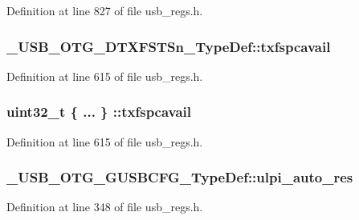 Definition at line 827 of file usb\-\_\-regs.\-h.

\hypertarget{group___u_s_b___o_t_g___d_r_i_v_e_r_ga8c5fd712fbdfea0b80c533af69d25f33}{
\subsubsection[{txfspcavail}]{ \-\_\-\-U\-S\-B\-\_\-\-O\-T\-G\-\_\-\-D\-T\-X\-F\-S\-T\-Sn\-\_\-\-Type\-Def\-::txfspcavail}}\label{group___u_s_b___o_t_g___d_r_i_v_e_r_ga8c5fd712fbdfea0b80c533af69d25f33}


Definition at line 615 of file usb\-\_\-regs.\-h.

\hypertarget{group___u_s_b___o_t_g___d_r_i_v_e_r_ga9bddde86aafdea74dd4a18180c1a6202}{
\subsubsection[{txfspcavail}]{\setlength{\rightskip}{0pt plus 5cm}uint32\-\_\-t \{ ... \} \-::txfspcavail}}\label{group___u_s_b___o_t_g___d_r_i_v_e_r_ga9bddde86aafdea74dd4a18180c1a6202}


Definition at line 615 of file usb\-\_\-regs.\-h.

\hypertarget{group___u_s_b___o_t_g___d_r_i_v_e_r_ga7eac0fd686a7c2a5fb6806f37eb05c15}{
\subsubsection[{ulpi\-\_\-auto\-\_\-res}]{ \-\_\-\-U\-S\-B\-\_\-\-O\-T\-G\-\_\-\-G\-U\-S\-B\-C\-F\-G\-\_\-\-Type\-Def\-::ulpi\-\_\-auto\-\_\-res}}\label{group___u_s_b___o_t_g___d_r_i_v_e_r_ga7eac0fd686a7c2a5fb6806f37eb05c15}


Definition at line 348 of file usb\-\_\-regs.\-h.

